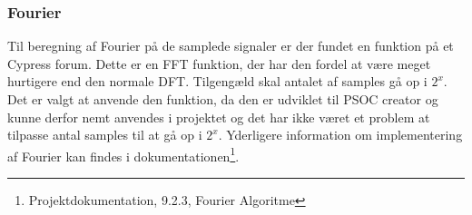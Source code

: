 
\subsubsection{Fourier}

Til beregning af Fourier på de samplede signaler er der fundet en funktion på et Cypress forum\cite{FFTalgo}. Dette er en FFT funktion, der har den fordel at være meget hurtigere end den normale DFT. Tilgengæld skal antalet af samples gå op i $2^{x}$. Det er valgt at anvende den funktion, da den er udviklet til PSOC creator og kunne derfor nemt anvendes i projektet og det har ikke været et problem at tilpasse antal samples til at gå op i $2^{x}$. Yderligere information om implementering af Fourier kan findes i dokumentationen\footnote{Projektdokumentation, 9.2.3, Fourier Algoritme}. 